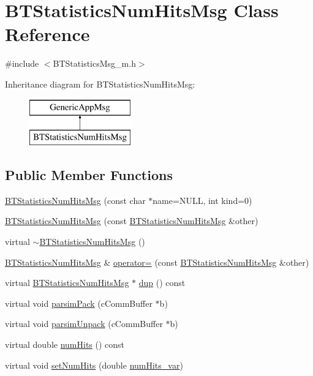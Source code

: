 \hypertarget{classBTStatisticsNumHitsMsg}{}\section{B\+T\+Statistics\+Num\+Hits\+Msg Class Reference}
\label{classBTStatisticsNumHitsMsg}


{\ttfamily \#include $<$B\+T\+Statistics\+Msg\+\_\+m.\+h$>$}

Inheritance diagram for B\+T\+Statistics\+Num\+Hits\+Msg\+:\begin{figure}[H]
\begin{center}
\leavevmode
\includegraphics[height=2.000000cm]{classBTStatisticsNumHitsMsg}
\end{center}
\end{figure}
\subsection*{Public Member Functions}
\begin{DoxyCompactItemize}
\item 
\hyperlink{classBTStatisticsNumHitsMsg_a48a37fdce2832cda8c98f6864a602464}{B\+T\+Statistics\+Num\+Hits\+Msg} (const char $\ast$name=N\+U\+L\+L, int kind=0)
\item 
\hyperlink{classBTStatisticsNumHitsMsg_ab6d8b31a3fc613f9d6400f869dfc8532}{B\+T\+Statistics\+Num\+Hits\+Msg} (const \hyperlink{classBTStatisticsNumHitsMsg}{B\+T\+Statistics\+Num\+Hits\+Msg} \&other)
\item 
virtual \hyperlink{classBTStatisticsNumHitsMsg_afb330a4e351d76177965e09d8fd52c7c}{$\sim$\+B\+T\+Statistics\+Num\+Hits\+Msg} ()
\item 
\hyperlink{classBTStatisticsNumHitsMsg}{B\+T\+Statistics\+Num\+Hits\+Msg} \& \hyperlink{classBTStatisticsNumHitsMsg_a74b35dfa26a72be8faf9334103913286}{operator=} (const \hyperlink{classBTStatisticsNumHitsMsg}{B\+T\+Statistics\+Num\+Hits\+Msg} \&other)
\item 
virtual \hyperlink{classBTStatisticsNumHitsMsg}{B\+T\+Statistics\+Num\+Hits\+Msg} $\ast$ \hyperlink{classBTStatisticsNumHitsMsg_a74abfdee89f6fd590ba930534ece7a60}{dup} () const 
\item 
virtual void \hyperlink{classBTStatisticsNumHitsMsg_aad9ededcecb9b2fcae86683baa48851c}{parsim\+Pack} (c\+Comm\+Buffer $\ast$b)
\item 
virtual void \hyperlink{classBTStatisticsNumHitsMsg_a28ce087da02b0d989b2120274e6e660c}{parsim\+Unpack} (c\+Comm\+Buffer $\ast$b)
\item 
virtual double \hyperlink{classBTStatisticsNumHitsMsg_ada909e3fd93e099cb0ec5c25fca1047c}{num\+Hits} () const 
\item 
virtual void \hyperlink{classBTStatisticsNumHitsMsg_af0a902e211d083fbd601a0d6f6939c7d}{set\+Num\+Hits} (double \hyperlink{classBTStatisticsNumHitsMsg_a88f5611c41dac9956bc6a07fe15f28eb}{num\+Hits\+\_\+var})
\end{DoxyCompactItemize}
